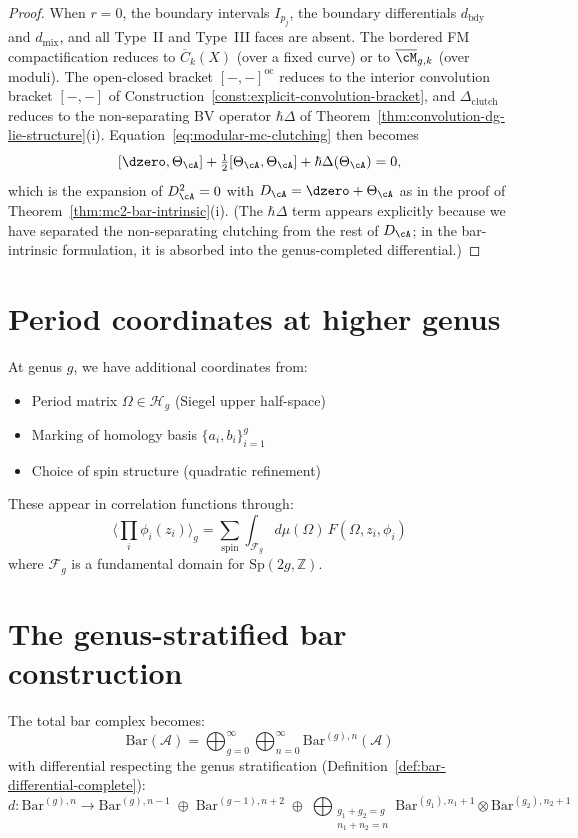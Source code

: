 \begin{proof}
When $r = 0$, the boundary intervals $I_{p_j}$, the
boundary differentials $d_{\mathrm{bdy}}$ and $d_{\mathrm{mix}}$,
and all Type~II and Type~III faces are absent.  The bordered FM
compactification reduces to $\overline{C}_k(X)$ (over a fixed
curve) or to $\overline{\cM}_{g,k}$ (over moduli).  The
open-closed bracket $[-,-]^{\mathrm{oc}}$ reduces to the
interior convolution bracket $[-,-]$ of
Construction~\ref{const:explicit-convolution-bracket}, and
$\Delta_{\mathrm{clutch}}$ reduces to the non-separating BV
operator $\hbar\Delta$ of
Theorem~\ref{thm:convolution-dg-lie-structure}(i).
Equation~\eqref{eq:modular-mc-clutching} then becomes
\[
[\dzero, \Theta_\cA]
+ \tfrac{1}{2}[\Theta_\cA, \Theta_\cA]
+ \hbar\Delta(\Theta_\cA) = 0,
\]
which is the expansion of $D_\cA^2 = 0$ with
$D_\cA = \dzero + \Theta_\cA$ as in the proof of
Theorem~\ref{thm:mc2-bar-intrinsic}(i).  (The $\hbar\Delta$
term appears explicitly because we have separated the
non-separating clutching from the rest of $D_\cA$; in the
bar-intrinsic formulation, it is absorbed into the
genus-completed differential.)
\end{proof}


\section{Period coordinates at higher genus}

At genus $g$, we have additional coordinates from:
\begin{itemize}
\item Period matrix $\Omega \in \mathcal{H}_g$ (Siegel upper half-space)
\item Marking of homology basis $\{a_i, b_i\}_{i=1}^g$
\item Choice of spin structure (quadratic refinement)
\end{itemize}

These appear in correlation functions through:
\[\langle \prod_i \phi_i(z_i) \rangle_g = \sum_{\text{spin}} \int_{\mathcal{F}_g} d\mu(\Omega) \, F(\Omega, z_i, \phi_i)\]
where $\mathcal{F}_g$ is a fundamental domain for $\text{Sp}(2g, \mathbb{Z})$.

\section{The genus-stratified bar construction}

The total bar complex becomes:
\[\text{Bar}(\mathcal{A}) = \bigoplus_{g=0}^{\infty} \bigoplus_{n=0}^{\infty} \text{Bar}^{(g),n}(\mathcal{A})\]
with differential respecting the genus stratification (Definition~\ref{def:bar-differential-complete}):
\[d: \text{Bar}^{(g),n} \to \text{Bar}^{(g),n-1} \;\oplus\; \text{Bar}^{(g-1),n+2} \;\oplus\; \bigoplus_{\substack{g_1+g_2=g \\ n_1+n_2=n}} \text{Bar}^{(g_1),n_1+1} \otimes \text{Bar}^{(g_2),n_2+1}\]

